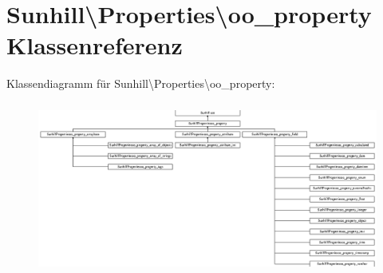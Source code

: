 \hypertarget{classSunhill_1_1Properties_1_1oo__property}{}\section{Sunhill\textbackslash{}Properties\textbackslash{}oo\+\_\+property Klassenreferenz}
\label{classSunhill_1_1Properties_1_1oo__property}
Klassendiagramm für Sunhill\textbackslash{}Properties\textbackslash{}oo\+\_\+property\+:\begin{figure}[H]
\begin{center}
\leavevmode
\includegraphics[height=5.675675cm]{df/dce/classSunhill_1_1Properties_1_1oo__property}
\end{center}
\end{figure}
